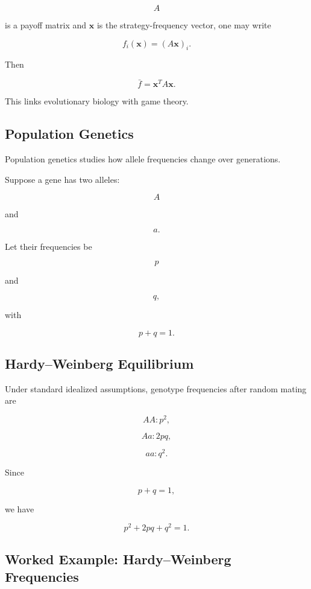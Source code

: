 \[
A
\]

is a payoff matrix and \(\mathbf{x}\) is the strategy-frequency vector, one
may write

\[
\boxed{
f_i(\mathbf{x})
=
(A\mathbf{x})_i.
}
\]

Then

\[
\boxed{
\bar f
=
\mathbf{x}^{T}A\mathbf{x}.
}
\]

This links evolutionary biology with game theory.

\subsection{Population Genetics}
\label{subsec:population-genetics-models}

Population genetics studies how allele frequencies change over generations.

Suppose a gene has two alleles:

\[
\boxed{
A
}
\]

and

\[
\boxed{
a.
}
\]

Let their frequencies be

\[
p
\]

and

\[
q,
\]

with

\[
\boxed{
p+q=1.
}
\]

\subsection{Hardy--Weinberg Equilibrium}
\label{subsec:hardy-weinberg}

Under standard idealized assumptions, genotype frequencies after random
mating are

\[
\boxed{
AA:p^2,
}
\]

\[
\boxed{
Aa:2pq,
}
\]

\[
\boxed{
aa:q^2.
}
\]

Since

\[
p+q=1,
\]

we have

\[
\boxed{
p^2+2pq+q^2=1.
}
\]

\subsection{Worked Example: Hardy--Weinberg Frequencies}
\label{subsec:worked-hardy-weinberg}

